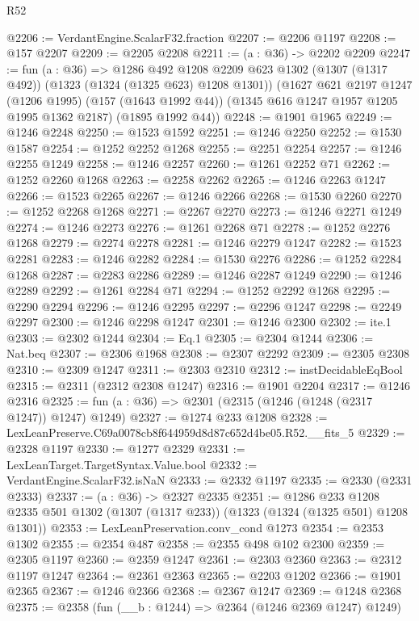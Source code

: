 \begin{lexlean}{R52}
\begin{coremodule}
@2206 := VerdantEngine.ScalarF32.fraction
@2207 := @2206 @1197
@2208 := @157 @2207
@2209 := @2205 @2208
@2211 := (a : @36) -> @2202 @2209
@2247 := fun (a : @36) =>
  @1286
    @492
    @1208
    @2209
    @623
    @1302
    (@1307 (@1317 @492))
    (@1323 (@1324 (@1325 @623) @1208 @1301))
    (@1627
      @621
      @2197
      @1247
      (@1206 @1995)
      (@157 (@1643 @1992 @44))
      (@1345 @616 @1247 @1957 @1205 @1995 @1362 @2187)
      (@1895 @1992 @44))
@2248 := @1901 @1965
@2249 := @1246 @2248
@2250 := @1523 @1592
@2251 := @1246 @2250
@2252 := @1530 @1587
@2254 := @1252 @2252 @1268
@2255 := @2251 @2254
@2257 := @1246 @2255 @1249
@2258 := @1246 @2257
@2260 := @1261 @2252 @71
@2262 := @1252 @2260 @1268
@2263 := @2258 @2262
@2265 := @1246 @2263 @1247
@2266 := @1523 @2265
@2267 := @1246 @2266
@2268 := @1530 @2260
@2270 := @1252 @2268 @1268
@2271 := @2267 @2270
@2273 := @1246 @2271 @1249
@2274 := @1246 @2273
@2276 := @1261 @2268 @71
@2278 := @1252 @2276 @1268
@2279 := @2274 @2278
@2281 := @1246 @2279 @1247
@2282 := @1523 @2281
@2283 := @1246 @2282
@2284 := @1530 @2276
@2286 := @1252 @2284 @1268
@2287 := @2283 @2286
@2289 := @1246 @2287 @1249
@2290 := @1246 @2289
@2292 := @1261 @2284 @71
@2294 := @1252 @2292 @1268
@2295 := @2290 @2294
@2296 := @1246 @2295
@2297 := @2296 @1247
@2298 := @2249 @2297
@2300 := @1246 @2298 @1247
@2301 := @1246 @2300
@2302 := ite.{1}
@2303 := @2302 @1244
@2304 := Eq.{1}
@2305 := @2304 @1244
@2306 := Nat.beq
@2307 := @2306 @1968
@2308 := @2307 @2292
@2309 := @2305 @2308
@2310 := @2309 @1247
@2311 := @2303 @2310
@2312 := instDecidableEqBool
@2315 := @2311 (@2312 @2308 @1247)
@2316 := @1901 @2204
@2317 := @1246 @2316
@2325 := fun (a : @36) => @2301 (@2315 (@1246 (@1248 (@2317 @1247)) @1247) @1249)
@2327 := @1274 @233 @1208
@2328 := LexLeanPreserve.C69a0078cb8f644959d8d87c652d4be05.R52.__fits_5
@2329 := @2328 @1197
@2330 := @1277 @2329
@2331 := LexLeanTarget.TargetSyntax.Value.bool
@2332 := VerdantEngine.ScalarF32.isNaN
@2333 := @2332 @1197
@2335 := @2330 (@2331 @2333)
@2337 := (a : @36) -> @2327 @2335
@2351 := @1286
    @233
    @1208
    @2335
    @501
    @1302
    (@1307 (@1317 @233))
    (@1323 (@1324 (@1325 @501) @1208 @1301))
@2353 := LexLeanPreservation.conv_cond @1273
@2354 := @2353 @1302
@2355 := @2354 @487
@2358 := @2355 @498 @102 @2300
@2359 := @2305 @1197
@2360 := @2359 @1247
@2361 := @2303 @2360
@2363 := @2312 @1197 @1247
@2364 := @2361 @2363
@2365 := @2203 @1202
@2366 := @1901 @2365
@2367 := @1246 @2366
@2368 := @2367 @1247
@2369 := @1248 @2368
@2375 := @2358 (fun (__b : @1244) => @2364 (@1246 @2369 @1247) @1249)

\end{coremodule}
\end{lexlean}
